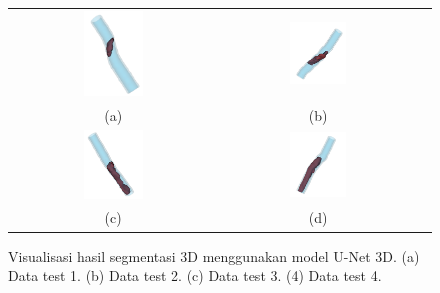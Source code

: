 \begin{figure}[H]
	\centering
	\begin{tabular}{ccc}
		\includegraphics[width=0.3\textwidth]{bab4/segmentasi 3D/data_test_1.png} &
		\includegraphics[width=0.3\textwidth]{bab4/segmentasi 3D/data_test_2.png}  \\
		(a)  & (b)    \\ %
		\includegraphics[width=0.3\textwidth]{bab4/segmentasi 3D/data_test_3.png} &
		\includegraphics[width=0.3\textwidth]{bab4/segmentasi 3D/data_test_4.png} \\
		(c)  & (d)    %
	\end{tabular}
	\caption{Visualisasi hasil segmentasi 3D menggunakan model U-Net 3D. (a) Data test 1. (b) Data test 2. (c) Data test 3. (4) Data test 4.}
	\label{fig:result-visualize-3D}
\end{figure}




